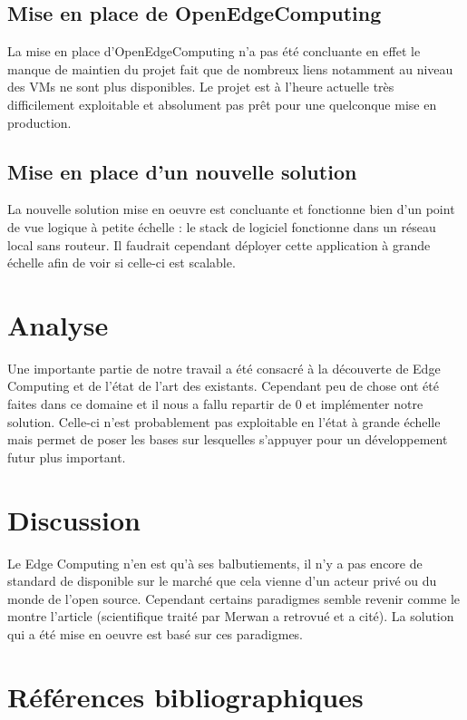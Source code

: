 \documentclass[twocolumn,a4paper]{IEEEtranfr}
\begin{document}
\subsection{Mise en place de OpenEdgeComputing}

La mise en place d’OpenEdgeComputing n’a pas été concluante en effet le manque de maintien du projet fait que de nombreux liens notamment au niveau des VMs ne sont plus disponibles. Le projet est à l’heure actuelle très difficilement exploitable et absolument pas prêt pour une quelconque mise en production.

\subsection{Mise en place d'un nouvelle solution}

La nouvelle solution mise en oeuvre est concluante et fonctionne bien d’un point de vue logique à petite échelle : le stack de logiciel fonctionne dans un réseau local sans routeur. Il faudrait cependant déployer cette application à grande échelle afin de voir si celle-ci est scalable.

\section{Analyse}

Une importante partie de notre travail a été consacré à la découverte de Edge Computing et de l’état de l’art des existants. Cependant peu de chose ont été faites dans ce domaine et il nous a fallu repartir de 0 et implémenter notre solution. Celle-ci n’est probablement pas exploitable en l’état à grande échelle mais permet de poser les bases sur lesquelles s’appuyer pour un développement futur plus important.

\section{Discussion}

Le Edge Computing n’en est qu’à ses balbutiements, il n’y a pas encore de standard de disponible sur le marché que cela vienne d’un acteur privé ou du monde de l’open source. Cependant certains paradigmes semble revenir comme le montre l’article (scientifique traité par Merwan a retrovué et a cité). La solution qui a été mise en oeuvre est basé sur ces paradigmes.

\section{Références bibliographiques}

%
\end{document}
